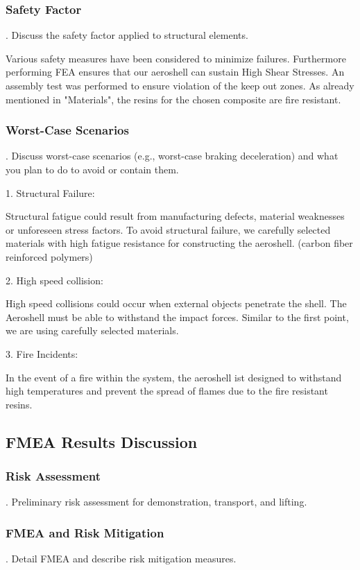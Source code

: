 \subsubsection{Safety Factor}
.  Discuss the safety factor applied to structural elements.
\par %
Various safety measures have been considered to minimize failures. Furthermore performing FEA ensures that our aeroshell can sustain High Shear Stresses. An assembly test was performed to ensure violation of the keep out zones. As already mentioned in "Materials", the resins for the chosen composite are fire resistant.
\par %
\subsubsection{Worst-Case Scenarios}
.  Discuss worst-case scenarios (e.g., worst-case braking deceleration) and what you plan to do to avoid or contain them.
\par %
1. Structural Failure: 
\par %
Structural fatigue could result from manufacturing defects, material weaknesses or unforeseen stress factors. To avoid structural failure, we carefully selected materials with high fatigue resistance for constructing the aeroshell. (carbon fiber reinforced polymers)
\par %
2. High speed collision:
\par %
High speed collisions could occur when external objects penetrate the shell. The Aeroshell must be able to withstand the impact forces. Similar to the first point, we are using carefully selected materials.
\par %
3. Fire Incidents:
\par %
In the event of a fire within the system, the aeroshell ist designed to withstand high temperatures and prevent the spread of flames due to the fire resistant resins.
\par %
\subsection{FMEA Results Discussion}
\subsubsection{Risk Assessment}
.  Preliminary risk assessment for demonstration, transport, and lifting.
\subsubsection{FMEA and Risk Mitigation}
.  Detail FMEA and describe risk mitigation measures.
